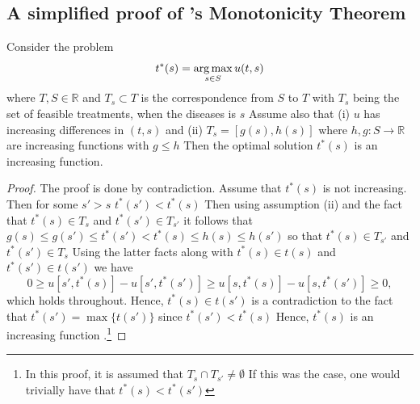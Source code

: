 \documentclass[10pt,a4paper]{article} 					%
\begin{document}
\begin{appendices}
\subsection[A simplified proof of Topkis’s Monotonicity Theorem is]{A simplified proof of 's Monotonicity Theorem}
\begin{thm}
	Consider the problem
	\[
		t^*(s)=\argmax_{s\in S} u(t,s)
	\]
	where \(T,S\in \mathbb{R}\) and \(T_s\subset T\) is the correspondence from \(S\) to \(T\)  with \(T_s\) being the set of feasible treatments, when the diseases is \(s\)  Assume also that (i) \(u\) has increasing differences in \((t,s)\)  and (ii) \(T_s=[g(s),h(s)]\)  where \(h,g:S \rightarrow \mathbb{R}\) are increasing functions with \(g\leq h\)  Then the optimal solution \(t^*(s)\) is an increasing function.
\end{thm}

\begin{proof}
	The proof is done by contradiction. Assume that \(t^*(s)\) is not increasing. Then for some \(s'>s\)  \(t^*(s')<t^*(s)\)  Then using assumption (ii) and the fact that \(t^*(s)\in T_s\)  and \(t^*(s')\in T_{s'}\)  it follows that \(g(s)\leq g(s')\leq t^*(s') < t^*(s) \leq h(s) \leq h(s')\)  so that \(t^*(s)\in T_{s'}\) and \(t^*(s')\in T_s\)  Using the latter facts along with \(t^*(s)\in t(s)\) and \(t^*(s')\in t(s')\)  we have
	\[
		0\geq u[s',t^*(s)]-u[s',t^*(s')]\geq u[s,t^*(s)]-u[s,t^*(s')]\geq 0,
	\]
which holds throughout. Hence, \(t^*(s)\in t(s')\) is a contradiction to the fact that \(t^*(s')=\max \{t(s')\}\)  since \(t^*(s')<t^*(s)\)  Hence, \(t^*(s)\) is an increasing function \parencite{Amir2005}.\footnote{In this proof, it is assumed that \(T_s\cap T_{s'}\ne \emptyset\) If this was the case, one would trivially have that \(t^*(s)<t^*(s')\) }

\end{proof}
\end{appendices}
\end{document}
